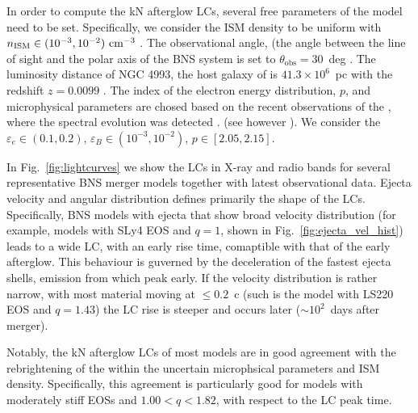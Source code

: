 In order to compute the \ac{kN} afterglow \acp{LC}, several free parameters of the model
need to be set. Specifically, we consider the \ac{ISM} density to be uniform with 
$n_{\text{ISM}}\in(10^{-3}, 10^{-2})\,\,\text{cm}^{-3}$ \citep{Hajela:2019mjy}. 
The observational angle, (the angle between the line of sight and the polar axis of the 
\ac{BNS} system is set to $\theta_{\text{obs}}=30$~deg \citep{TheLIGOScientific:2017qsa}.
The luminosity distance of NGC 4993, the host galaxy of \GW{} is  $41.3\times10^{6}$~pc 
with the redshift $z=0.0099$ \citep{Hjorth:2017yza}.
%
The index of the electron energy distribution, $p$, and microphysical parameters are 
chosed based on the recent observations of the \GRB{}, where the spectral evolution 
was detected \cite{Hajela:2021faz}.  (see however \citet{Troja:2021xsw}). 
%
We consider the 
$\varepsilon_e\in(0.1, 0.2)$,
$\varepsilon_B\in(10^{-3}, 10^{-2})$, 
$p\in[2.05,2.15]$.


In Fig.~\ref{fig:lightcurves} we show the \acp{LC} in X-ray and radio bands for several 
representative \ac{BNS} merger models together with latest \GRB{} observational data. 
Ejecta velocity and angular distribution defines primarily the shape of the \acp{LC}.
Specifically, \ac{BNS} models with ejecta that show broad velocity distribution 
(for example, models with SLy4 \ac{EOS} and $q=1$, shown in Fig.~\ref{fig:ejecta_vel_hist})
leads to a wide \ac{LC}, with an early rise time, comaptible with that of the early \GRB{}
afterglow. This behaviour is guverned by the deceleration of the fastest ejecta shells, 
emission from which peak early. If the velocity distribution is rather narrow, with most 
material moving at ${\leq}0.2$~c (such is the model with LS220 \ac{EOS} and $q=1.43$) 
the \ac{LC} rise is steeper and occurs later (${\sim}10^2$~days after merger). 

Notably, the \ac{kN} afterglow \acp{LC} of most models are in good agreement with the 
rebrightening of the \GRB{} within the uncertain microphsical parameters and \ac{ISM} 
density.
Specifically, this agreement is particularly good for models with moderately stiff 
\acp{EOS} and $1.00<q<1.82$, with respect to the \ac{LC} peak time.


